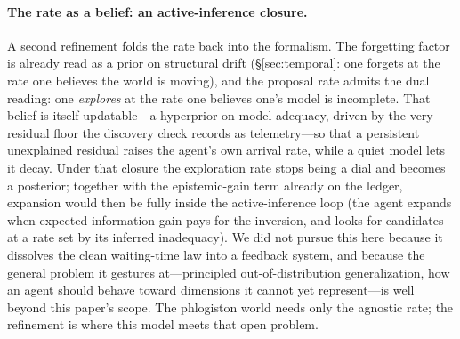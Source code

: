\paragraph{The rate as a belief: an active-inference closure.}
A second refinement folds the rate back into the formalism. The forgetting factor is already
read as a prior on structural drift (\S\ref{sec:temporal}: one forgets at the rate one believes
the world is moving), and the proposal rate admits the dual reading: one \emph{explores} at the
rate one believes one's model is incomplete. That belief is itself updatable---a hyperprior on
model adequacy, driven by the very residual floor the discovery check records as telemetry---so
that a persistent unexplained residual raises the agent's own arrival rate, while a quiet model
lets it decay. Under that closure the exploration rate stops being a dial and becomes a
posterior; together with the epistemic-gain term already on the ledger, expansion would then be
fully inside the active-inference loop (the agent expands when expected information gain pays
for the inversion, and looks for candidates at a rate set by its inferred inadequacy). We did
not pursue this here because it dissolves the clean waiting-time law into a feedback system,
and because the general problem it gestures at---principled out-of-distribution generalization,
how an agent should behave toward dimensions it cannot yet represent---is well beyond this
paper's scope. The phlogiston world needs only the agnostic rate; the refinement is where this
model meets that open problem.
